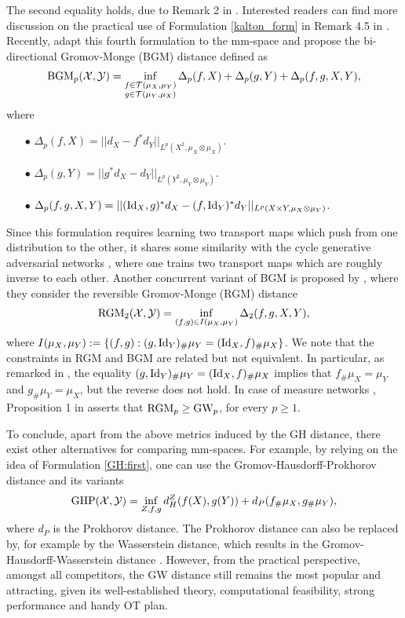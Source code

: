 The second equality holds, due to Remark 2 in \citep{Memoli05}. Interested readers can find
more discussion on the practical use of Formulation \eqref{kalton_form} in
Remark 4.5 in \citep{Memoli11b}.
Recently, \citet{Zhang21} adapt this fourth formulation to the mm-space and propose
the bi-directional Gromov-Monge (BGM) distance defined as
\begin{align}
  \text{BGM}_p(\mathcal X, \mathcal Y) =
  \inf_{\substack{f \in \mathcal T(\mu_X, \mu_Y) \\ g \in \mathcal T(\mu_Y, \mu_X)}}
  \Delta_{p}(f,X) + \Delta_{p}(g,Y) + \Delta_{p}(f,g, X, Y),
\end{align}
where
\begin{itemize}
  \item[$\bullet$] $\Delta_{p}(f, X) = || d_X - f^* d_Y ||_{L^p(X^2, \mu_X \otimes \mu_X)}$.
  \item[$\bullet$] $\Delta_{p}(g, Y) = || g^* d_X - d_Y ||_{L^p(Y^2, \mu_Y \otimes \mu_Y)}$.
  \item[$\bullet$] $\Delta_{p}(f,g, X, Y) = || (\text{Id}_X, g)^*d_X - (f, \text{Id}_Y)^*d_Y ||_{L^p(X \times Y, \mu_X \otimes \mu_Y)}$.
\end{itemize}
Since this formulation requires learning two transport maps which push from one distribution to the other,
it shares some similarity with the cycle generative adversarial networks \citep{Zhu17,Kim17},
where one trains two transport maps which are roughly inverse to each other.
Another concurrent variant of BGM is proposed by \citet{Hur21},
where they consider the reversible Gromov-Monge (RGM) distance
\begin{align}
  \text{RGM}_2(\mathcal X, \mathcal Y) = \inf_{(f,g) \in I(\mu_X, \mu_Y)} \Delta_2(f,g, X, Y),
\end{align}
where $I(\mu_X, \mu_Y) := \{(f, g): (g, \text{Id}_Y)_{\#} \mu_Y = (\text{Id}_X, f)_{\#} \mu_X \}$.
We note that the constraints in RGM and BGM are related but not equivalent. In particular,
as remarked in \citep{Hur21}, the equality $(g, \text{Id}_Y)_{\#} \mu_Y = (\text{Id}_X, f)_{\#} \mu_X$
implies that $ f_{\#}\mu_X = \mu_Y$ and $g_{\#} \mu_Y = \mu_X$, but the reverse does not hold.
In case of measure networks \citep{Chowdhury19}, Proposition 1 in \citep{Hur21} asserts that
$\text{RGM}_p \geq \text{GW}_p$, for every $p \geq 1$.

To conclude, apart from the above metrics induced by the GH distance, there exist other
alternatives for comparing mm-spaces. For example, by relying on the idea of
Formulation \eqref{GH:first},
one can use the Gromov-Hausdorff-Prokhorov distance \citep{Villani08} and
its variants \citep{Abraham13,Miermont09}
\begin{align}
  \text{GHP}(\mathcal X, \mathcal Y) =
  \inf_{Z, f, g} d_H^Z(f(X), g(Y)) + d_P(f_{\#} \mu_X, g_{\#} \mu_Y),
\end{align}
where $d_P$ is the Prokhorov distance. The Prokhorov distance can also be replaced by,
for example by the Wasserstein distance, which results in the
Gromov-Hausdorff-Wasserstein distance \citep{Villani08}. However, from the practical perspective,
amongst all competitors, the GW distance still remains the most popular and attracting,
given its well-established theory, computational feasibility, strong performance and
handy OT plan.

